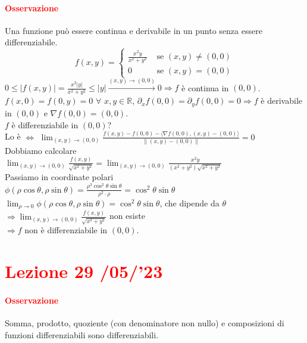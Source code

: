 \documentclass{article}
\newcommand{\R}{\mathbb{R}}
\begin{document}
\paragraph{\textcolor{red}{Osservazione}}
Una funzione può essere continua e derivabile in un punto senza essere differenziabile.
\begin{equation*}
    f(x,y)=\begin{cases}
    \frac{x^2y}{x^2+y^2}&\text{  se  }(x,y)\neq (0,0) \\
    0&\text{  se  }(x,y)=(0,0)
\end{cases}
\end{equation*}
$0 \leq |f(x,y)|=\frac{x^2|y|}{x^2+y^2}\leq |y|\xrightarrow{(x,y)\rightarrow(0,0)}0 \Rightarrow f$ è continua in $(0,0)$. \\
$f(x,0)=f(0,y)=0 \,\,\forall \,\,x,y \in \R$, $\partial_{x}f(0,0)=\partial_yf(0,0)=0 \Rightarrow f$ è derivabile in $(0,0)$ e $\nabla f(0,0)=(0,0)$.\\
$f$ è differenziabile in $(0,0)$?\\
Lo è $\Leftrightarrow$
$\lim_{(x,y)\rightarrow(0,0)}\frac{f(x,y)-f(0,0)-\langle \nabla f(0,0),(x,y)-(0,0) \rangle}{\|(x,y)-(0,0)\|}=0$\\
Dobbiamo calcolare \\
$\lim_{(x,y)\rightarrow(0,0)}\frac{f(x,y)}{\sqrt{x^2+y^2}}=\lim_{(x,y)\rightarrow(0,0)}\frac{x^2y}{(x^2+y^2)\sqrt{x^2+y^2}}$\\
Passiamo in coordinate polari\\
$\phi(\rho\cos\theta,\rho\sin\theta)=\frac{\rho^3\cos^2\theta\sin\theta}{\rho^2\cdot \rho}=\cos^2\theta\sin\theta$\\
$\lim_{\rho\rightarrow0}\phi(\rho\cos\theta,\rho\sin\theta)=\cos^2\theta\sin\theta$, che dipende da $\theta$\\
$\Rightarrow \lim_{(x,y)\rightarrow(0,0)}\frac{f(x,y)}{\sqrt{x^2+y^2}}$ non esiste\\
$\Rightarrow f$ non è differenziabile in $(0,0)$.

\newpage
\section{\textcolor{red}{Lezione 29 \space{}/05/'23}}
\paragraph{\textcolor{red}{Osservazione}}
Somma, prodotto, quoziente (con denominatore non nullo) e composizioni di funzioni differenziabili sono differenziabili.
\end{document}
